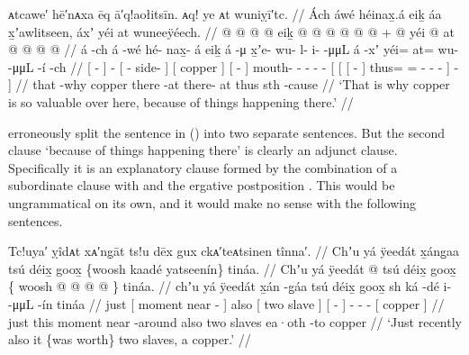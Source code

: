 \ex\label{ex:89-201-copper-valuable-because}%
%
\begingl
	\glpreamble	ᴀtcawe′ hē′nᴀxa ēq ā′q!aołitsīn. ᴀq! ye ᴀt wuniỵī′tc. //
	\glpreamble	Ách áwé héinax̱.á eiḵ áa x̱ʼawlitseen, áxʼ yéi at wuneeÿéech. //
	\gla	{}  @ {} {}  @ {}
		{}  @ {} @ {} {}
		{} eiḵ {}
		{}  @ {} {}
		 @ {} @ {} @ {} @ {} @ {} +
		{} {} {}  @ {} {}
			yéi @ at @  @ {} @ {} @ {} {} {} {} //
	\glb	{} á -ch {} á -wé
		{} hé- nax̱- á {}
		{} eiḵ {}
		{} á -μ {}
		x̱ʼe- wu- l- i-  -μμL
		{} {} {} á -xʼ {}
			yéi= at= wu-  -μμL -í {} -ch {} //
	\glc	{}[  - {}]  -
		{}[ - side-  {}]
		{}[ copper {}]
		{}[  - {}]
		mouth- - - -  -
		{}[ {}[ {}[  - {}]
			thus= = -  - - {}] - {}] //
	\gld	{} that -why {}  {}
		{}  {} {} {}
		{} copper {}
		{} there -at {}
		 {} {} {} {} {}
		{} {} {} there- at {}
			thus\• sth\•  {} {} {} {} -cause {} //
	\glft	‘That is why copper is so valuable over here, because of things happening there.’
		//
\endgl
\xe

\citeauthor{swanton:1909} erroneously split the sentence in (\lastx) into two separate sentences.
But the second clause  ‘because of things happening there’ is clearly an adjunct clause.
Specifically it is an explanatory clause formed by the combination of a subordinate clause with  and the ergative postposition .
This would be ungrammatical on its own, and it would make no sense with the following sentences.

\ex\label{ex:89-202-worth-two-slaves-copper}%
%
\begingl
	\glpreamble	Tc!uya′ ỵîdᴀt xᴀ′ng̣āt ts!u dēx gux ckᴀ′teᴀtsinen tînna′. //
	\glpreamble	Chʼu yá ÿeedát x̱áng̱aa tsú déix̱ goox̱ \{woosh kaadé yatseenín\} tináa. //
	\gla	Chʼu {} yá ÿeedát  @ {} {} tsú
		{} déix̱ goox̱ {}
		{}\{
			{} woosh  @ {} {}
			 @ {} @ {} @ {}
		{}\}
		{} tináa. {} //
	\glb	chʼu {} yá ÿeedát x̱án -g̱áa {} tsú
		{} déix̱ goox̱ {}
		{}
			{} sh ká -dé {}
			i-  -μμL -ín
		{}
		{} tináa {} //
	\glc	just {}[  moment near - {}] also
		{}[ two slave {}]
		{} 
			{}[   - {}]
			-  - -
		{} 
		{}[ copper {}] //
	\gld	just {} this moment near -around {} also
		{} two slaves {}
		{} 
			{} ea·oth {} -to {}
			 {} {} {}
		{} 
		{} copper {} //
	\glft	‘Just recently also it \{was worth\} two slaves, a copper.’
		//
\endgl
\xe

